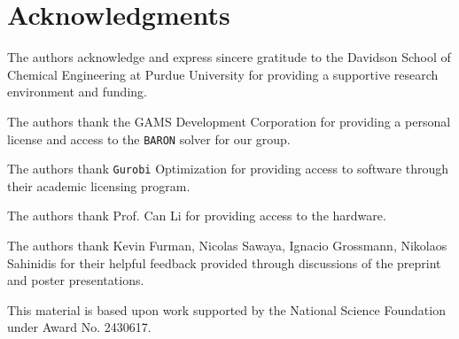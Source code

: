 \documentclass[11pt]{article}
\begin{document}
\section*{Acknowledgments}

The authors acknowledge and express sincere gratitude to the Davidson School of Chemical Engineering at Purdue University for providing a supportive research environment and funding.

The authors thank the GAMS Development Corporation for providing a personal license and access to the \texttt{BARON} solver for our group.

The authors thank \texttt{Gurobi} Optimization for providing access to software through their academic licensing program.

The authors thank Prof. Can Li for providing access to the hardware.

The authors thank Kevin Furman,  Nicolas Sawaya, Ignacio Grossmann,  Nikolaos Sahinidis for their helpful feedback provided through discussions of the preprint and poster presentations.

This material is based upon work supported by the National Science Foundation under Award No. 2430617.
\end{document}
